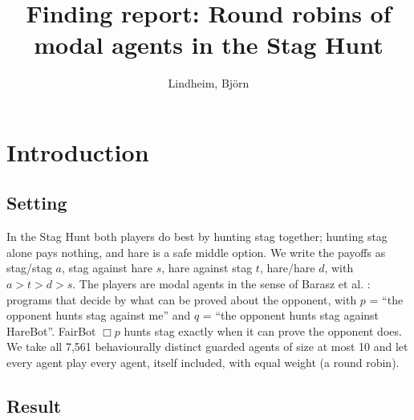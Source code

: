 \documentclass{article}
\title{Finding report: Round robins of modal agents in the Stag Hunt}
\author{Lindheim, Björn}
\date{}
\begin{document}
\maketitle
\section{Introduction}
\label{sec:staghunt-round-robin}

\subsection*{Setting}

In the Stag Hunt both players do best by hunting stag together; hunting stag alone pays nothing,
and hare is a safe middle option. We write the payoffs as stag/stag $a$, stag against hare $s$,
hare against stag $t$, hare/hare $d$, with $a > t > d > s$. The players are modal agents in the
sense of Barasz et al. \cite{barasz2014robust}: programs that decide by what can be proved about the
opponent, with $p$ = ``the opponent hunts stag against me'' and $q$ = ``the opponent hunts stag
against HareBot''. FairBot $\Box p$ hunts stag exactly when it can prove the opponent does. We take
all 7,561 behaviourally distinct guarded agents of size at most 10 and let every agent play every
agent, itself included, with equal weight (a round robin).

\subsection*{Result}
\end{document}
